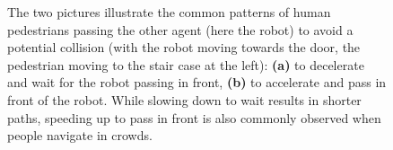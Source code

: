 \documentclass[conference]{IEEEtran}
\begin{document}
\begin{figure}[t]
  \begin{center}
  \hspace*{-1em}
  \hspace*{-0.03em}
  \end{center}
  \vspace{-0.85em}
  \caption{The two pictures illustrate the common patterns of human 
    pedestrians passing the other agent (here the robot) to avoid a potential 
    collision (with the robot 
    moving towards the door, the pedestrian moving to the stair case at the left): {\bf (a)} to 
    decelerate and wait for the robot passing in front, 
    {\bf (b)} to accelerate and pass in front of the robot. %
    While 
    slowing down to wait results in shorter paths, speeding up to pass in 
    front is also commonly observed when people navigate in crowds. 
    }  
  \vspace{-0.6em}
\label{fig1}
\end{figure}


\end{document}
